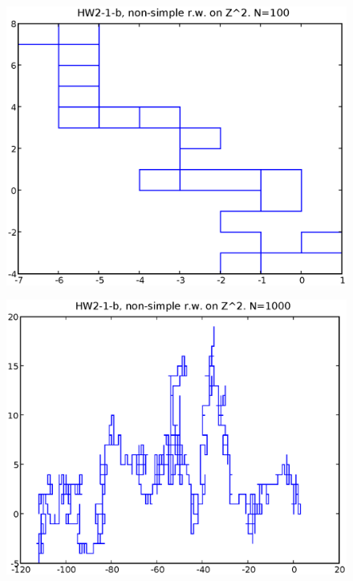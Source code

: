 \documentclass[a4paper,10pt]{article}
\begin{document}
\begin{figure}
\includegraphics[width=1\textwidth]{hw2_1_b_N100.eps}
\caption{}
\end{figure}
\begin{figure}
\includegraphics[width=1\textwidth]{hw2_1_b_N1000.eps}
\caption{}
\end{figure}
\end{document}
